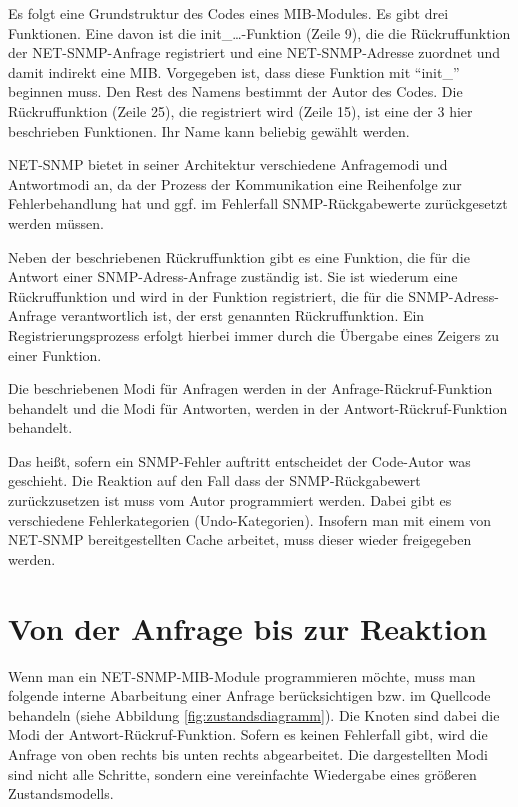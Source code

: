 \documentclass[12pt,ngerman,toc=listofnumbered,toc=bibliographynumbered,toc=index,headsepline=true]{scrbook}
\begin{document}
Es folgt eine  Grundstruktur des Codes eines MIB-Modules. Es gibt drei
Funktionen. Eine davon ist die init\_\ldots-Funktion (Zeile 9), die die
Rückruffunktion der NET-SNMP-Anfrage registriert und eine NET-SNMP-Adresse
zuordnet und damit indirekt eine MIB. Vorgegeben ist, dass diese Funktion mit
\enquote{init\_} beginnen muss. Den Rest des Namens bestimmt der Autor des
Codes. Die Rückruffunktion (Zeile 25), die registriert wird (Zeile 15), ist eine
der 3 hier beschrieben Funktionen. Ihr Name kann beliebig gewählt werden.

NET-SNMP bietet in seiner Architektur verschiedene Anfragemodi und Antwortmodi
an, da der Prozess der Kommunikation eine Reihenfolge zur Fehlerbehandlung hat
und ggf. im Fehlerfall SNMP-Rückgabewerte zurückgesetzt werden müssen.

Neben der beschriebenen Rückruffunktion gibt es eine Funktion, die für die
Antwort einer SNMP-Adress-Anfrage zuständig ist. Sie ist wiederum eine
Rückruffunktion und wird in der Funktion registriert, die für die
SNMP-Adress-Anfrage verantwortlich ist, der erst genannten Rückruffunktion. Ein
Registrierungsprozess erfolgt hierbei immer durch die Übergabe eines Zeigers zu
einer Funktion.

Die beschriebenen Modi für Anfragen werden in der Anfrage-Rückruf-Funk\-ti\-on
behandelt und die Modi für Antworten, werden in der Antwort-Rückruf-Funktion
behandelt.

Das heißt, sofern ein SNMP-Fehler auftritt entscheidet der Code-Autor was
geschieht. Die Reaktion auf den Fall dass der SNMP-Rückgabewert zurückzusetzen
ist muss vom Autor programmiert werden. Dabei gibt es verschiedene
Fehlerkategorien (Undo-Kategorien). Insofern man mit einem von NET-SNMP
bereitgestellten Cache arbeitet, muss dieser wieder freigegeben werden.

\section{Von der Anfrage bis zur Reaktion}
Wenn man ein NET-SNMP-MIB-Module programmieren möchte, muss man folgende interne
Abarbeitung einer Anfrage berücksichtigen bzw. im Quellcode behandeln (siehe
Abbildung \ref{fig:zustandsdiagramm}). Die Knoten sind dabei die Modi der
Antwort-Rückruf-Funktion. Sofern es keinen Fehlerfall gibt, wird die Anfrage von
oben rechts bis unten rechts abgearbeitet. Die dargestellten Modi sind nicht
alle Schritte, sondern eine vereinfachte Wiedergabe eines größeren
Zustandsmodells.
\end{document}
